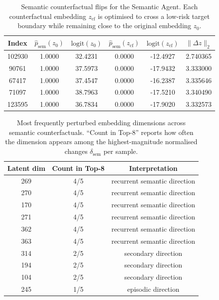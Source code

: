 \documentclass[3p]{elsarticle}
\begin{document}
\begin{table}[t]
\centering
\begin{tabular}{c c c c c c}
\hline
\textbf{Index} & $\hat{p}_{\mathrm{sem}}(z_0)$ & $\mathrm{logit}(z_0)$ &
$\hat{p}_{\mathrm{sem}}(z_{\mathrm{cf}})$ & $\mathrm{logit}(z_{\mathrm{cf}})$ &
$\lVert \Delta z\rVert_2$ \\
\hline
102930 & 1.0000 & 32.4231 & 0.0000 & -12.4927 & 2.740365 \\
90761  & 1.0000 & 37.5973 & 0.0000 & -17.9432 & 3.333000 \\
67417  & 1.0000 & 37.4547 & 0.0000 & -16.2387 & 3.335646 \\
71097  & 1.0000 & 38.7963 & 0.0000 & -17.5210 & 3.340490 \\
123595 & 1.0000 & 36.7834 & 0.0000 & -17.9020 & 3.332573 \\
\hline
\end{tabular}
\caption{Semantic counterfactual flips for the Semantic Agent. Each counterfactual embedding $z_{\mathrm{cf}}$ is optimised to cross a low-risk target boundary while remaining close to the original embedding $z_0$.}
\label{tab:sem_cf_flips}
\end{table}


\begin{table}[t]
\centering

\begin{tabular}{c c c}
\hline
\textbf{Latent dim} & \textbf{Count in Top-8} & \textbf{Interpretation} \\
\hline
269 & 4/5 & recurrent semantic direction \\
270 & 4/5 & recurrent semantic direction \\
170 & 4/5 & recurrent semantic direction \\
271 & 4/5 & recurrent semantic direction \\
362 & 4/5 & recurrent semantic direction \\
363 & 4/5 & recurrent semantic direction \\
314 & 2/5 & secondary direction \\
194 & 2/5 & secondary direction \\
104 & 2/5 & secondary direction \\
245 & 1/5 & episodic direction \\
\hline
\end{tabular}
\caption{Most frequently perturbed embedding dimensions across semantic counterfactuals. ``Count in Top-8'' reports how often the dimension appears among the highest-magnitude normalised changes $\delta_{\mathrm{sem}}$ per sample.}
\label{tab:sem_cf_dims}
\end{table}
\end{document}
